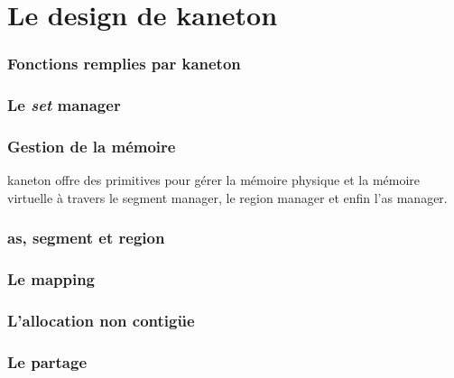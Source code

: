\section{Le design de kaneton}


\begin{frame}
  \frametitle{Fonctions remplies par kaneton}

\end{frame}

\begin{frame}
  \frametitle{Le \emph{set} manager}

\end{frame}


\begin{frame}
  \frametitle{Gestion de la m\'{e}moire}

  kaneton offre des primitives pour g\'{e}rer la m\'{e}moire physique et la
  m\'{e}moire virtuelle \`{a} travers le segment manager, le region manager et
  enfin l'as manager.

\end{frame}


\begin{frame}
  \frametitle{as, segment et region}

  \begin{center}
  \end{center}
\end{frame}


\begin{frame}
  \frametitle{Le mapping}

  \begin{center}
  \end{center}
\end{frame}


\begin{frame}
  \frametitle{L'allocation non contig\"{u}e}

  \begin{center}
  \end{center}
\end{frame}


\begin{frame}
  \frametitle{Le partage}

  \begin{center}
  \end{center}
\end{frame}

